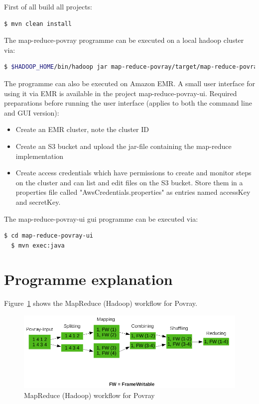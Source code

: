\documentclass{article}
\begin{document}
First of all build all projects:

\begin{lstlisting}[language=bash, deletekeywords={cd}]
  $ mvn clean install
\end{lstlisting}

The map-reduce-povray programme can be executed on a local hadoop cluster via:

\begin{lstlisting}[language=bash, deletekeywords={cd}]
  $ $HADOOP_HOME/bin/hadoop jar map-reduce-povray/target/map-reduce-povray-1.0.jar mapReducePovray.Povray <input-dir> <output-dir> <uri-of-pov-file>
\end{lstlisting}

The programme can also be executed on Amazon EMR. A small user interface for using it via EMR is available in the project map-reduce-povray-ui. Required preparations before running the user interface (applies to both the command line and GUI version):

\begin{itemize}
\item Create an EMR cluster, note the cluster ID
\item Create an S3 bucket and upload the jar-file containing the map-reduce implementation
\item Create access credentials which have permissions to create and monitor steps on the cluster and can list and edit files on the S3 bucket. Store them in a properties file called "AwsCredentials.properties" as entries named accessKey and secretKey.
\end{itemize}

The map-reduce-povray-ui gui programme can be executed via:

\begin{lstlisting}[language=bash, deletekeywords={cd}]
  $ cd map-reduce-povray-ui
  $ mvn exec:java
\end{lstlisting}

\section{Programme explanation}

Figure~\ref{fig:map-reduce-povray-workflow} shows the MapReduce (Hadoop) workflow for Povray.

\begin{figure}[htbp]
\begin{center}
\includegraphics[width=\textwidth]{map-reduce-povray-workflow.png}
\caption{MapReduce (Hadoop) workflow for Povray}
\label{fig:map-reduce-povray-workflow}
\end{center}
\end{figure}
\end{document}
